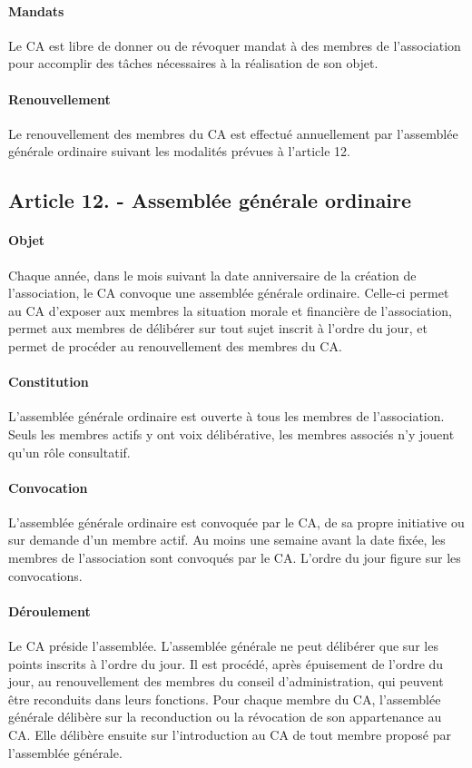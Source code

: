 \documentclass[a4paper]{article}
\begin{document}
\paragraph{Mandats}
Le CA est libre de donner ou de révoquer mandat à des 
membres de l'association
pour accomplir des tâches nécessaires à la réalisation de son objet.

\paragraph{Renouvellement}
Le renouvellement des membres du CA est effectué annuellement par l'assemblée générale ordinaire suivant les modalités prévues à l'article 12.


\subsection*{Article 12. - Assemblée générale ordinaire}

\paragraph{Objet}
Chaque année, dans le mois suivant la date anniversaire de la création de l'association,
le CA convoque une assemblée générale ordinaire. Celle-ci permet au CA d'exposer aux membres la situation
morale et financière de l'association, permet aux membres de délibérer sur tout sujet inscrit à l'ordre du jour, et permet de procéder au renouvellement des membres du CA.

\paragraph{Constitution} L'assemblée générale ordinaire est ouverte à
 tous les membres de l'association. Seuls les membres actifs y ont voix délibérative, les membres associés n'y jouent qu'un rôle consultatif.

\paragraph{Convocation}
L'assemblée générale ordinaire est convoquée par le CA, de sa propre initiative ou sur demande d'un membre actif.
Au moins une semaine avant la date fixée, les membres de l'association sont convoqués par le CA. L'ordre du jour figure sur les convocations.

\paragraph{Déroulement}
Le CA préside l'assemblée. 
L'assemblée générale ne peut délibérer que sur les points inscrits à l'ordre du jour.
Il est procédé, après épuisement de l'ordre du jour, au renouvellement des membres du conseil
d'administration, qui peuvent être reconduits dans leurs fonctions. Pour chaque membre du CA, l'assemblée générale délibère sur la reconduction ou la révocation de son appartenance au CA. Elle délibère ensuite sur l'introduction au CA de tout membre proposé par l'assemblée générale.
\end{document}
